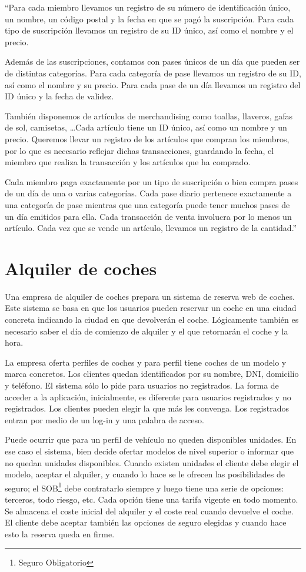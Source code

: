 \documentclass[a4paper]{article}
\begin{document}
``Para cada miembro llevamos un registro de su número de identificación único, un nombre, un código postal y la fecha en que se pagó la suscripción. Para cada tipo de suscripción llevamos un registro de su ID único, así como el nombre y el precio. 

Además de las suscripciones, contamos con pases únicos de un día que pueden ser de distintas categorías. Para cada categoría de pase llevamos un registro de su ID, así como el nombre y su precio. Para cada pase de un día llevamos un registro del ID único y la fecha de validez.

También disponemos de artículos de merchandising como toallas, llaveros, gafas de sol, camisetas, \ldots Cada artículo tiene un ID único, así como un nombre y un precio. Queremos llevar un registro de los artículos que compran los miembros, por lo que es necesario reflejar dichas transacciones, guardando la fecha, el miembro que realiza la transacción y los artículos que ha comprado.

Cada miembro paga exactamente por un tipo de suscripción o bien compra pases de un día de una o varias categorías. Cada pase diario pertenece exactamente a una categoría de pase mientras que una categoría puede tener muchos pases de un día emitidos para ella. Cada transacción de venta involucra por lo menos un artículo. Cada vez que se vende un artículo, llevamos un registro de la cantidad.''

\section{Alquiler de coches}
Una empresa de alquiler de coches prepara un sistema de reserva web de coches. Este sistema se basa en que los usuarios pueden reservar un coche en una ciudad concreta indicando la ciudad en que devolverán el coche. Lógicamente también es necesario saber el día de comienzo de alquiler y el que retornarán el coche y la hora. 

La empresa oferta perfiles de coches y para perfil tiene coches de un modelo y marca concretos. Los clientes quedan identificados por su nombre, DNI, domicilio y teléfono. El sistema sólo lo pide para usuarios no registrados. La forma de acceder a la aplicación, inicialmente, es diferente para usuarios registrados y no registrados. Los clientes pueden elegir la que más les convenga. Los registrados entran por medio de un log-in y una palabra de acceso.

Puede ocurrir que para un perfil de vehículo no queden disponibles unidades. En ese caso el sistema, bien decide ofertar modelos de nivel superior o informar que no quedan unidades disponibles. Cuando existen unidades el cliente debe elegir el modelo, aceptar el alquiler, y cuando lo hace se le ofrecen las posibilidades de seguro; el SOB\footnote{Seguro Obligatorio} debe contratarlo siempre y luego tiene una serie de opciones: terceros, todo riesgo, etc. Cada opción tiene una tarifa vigente en todo momento. Se almacena el coste inicial del alquiler y el coste real cuando devuelve el coche. El cliente debe aceptar también las opciones de seguro elegidas y cuando hace esto la reserva queda en firme. 
\end{document}
